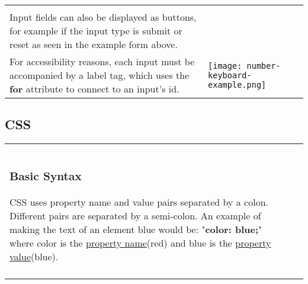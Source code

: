 \documentclass[12pt]{report}
\newcommand{\splitpage}[2]{\begin{tabular}{l l}\begin{minipage}{0.5\textwidth}#1\end{minipage}&\begin{minipage}{0.5\textwidth}#2\end{minipage}\end{tabular}}
\begin{document}
			\hspace{-0.7cm}

			\splitpage{
				Another reason to use proper input types is to create a responsive website, where a different keyboard will appear on a mobile device depending on the input type. For example, an input with the type numbers will bring up a keyboard on mobile devices that only includes numbers. See an an example of this below:\\

				Input fields can also be displayed as buttons, for example if the input type is submit or reset as seen in the example form above.\\

				For accessibility reasons, each input must be accompanied by a label tag, which uses the \textbf{for} attribute to connect to an input's id.
			}{
				\centering
				\texttt{[image: number-keyboard-example.png]}
				\label{fig:number-keyboard}
			}


			\vspace{1cm}
			\subsection{CSS}
			\vspace{0.5cm}
			\splitpage{
				\centering
				\texttt{[image: no-css-example.png]}\\
			}
			{
				\subsubsection{Introduction to CSS}
					Cascading Style Sheets tells the browser \textbf{HOW} to display the information in the HTML file. Without CSS the default styling is used, which means the webpage doesn't look very good, and will bore the user. This is why we use CSS!\\


				\subsubsection{Basic Syntax}
					CSS uses property name and value pairs separated by a colon. Different pairs are separated by a semi-colon. An example of making the text of an element blue would be: "\textbf{{\color{red}color}: {\color{blue}blue};}" where color is the \underline{property name}(red) and blue is the \underline{property value}(blue).\\


			}
\end{document}
